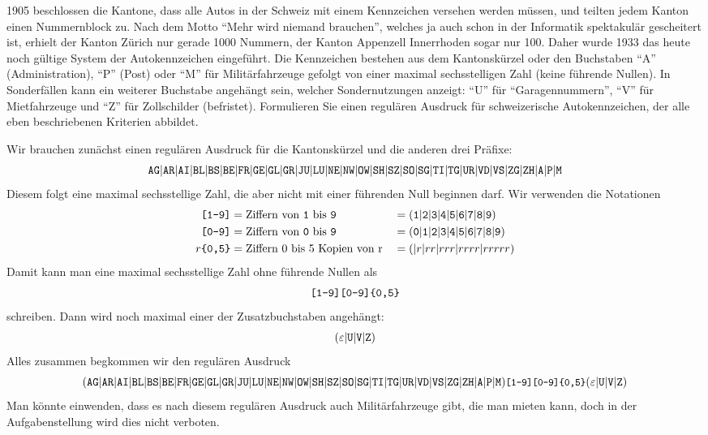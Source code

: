 1905 beschlossen die Kantone, dass alle Autos in der Schweiz mit einem
Kennzeichen versehen werden müssen, und teilten jedem Kanton einen
Nummernblock zu. Nach dem Motto ``Mehr wird niemand brauchen'', welches
ja auch schon in der Informatik spektakulär gescheitert ist, erhielt
der Kanton Zürich nur gerade 1000 Nummern, der
Kanton Appenzell Innerrhoden sogar nur 100.
Daher wurde 1933 das heute noch gültige System der Autokennzeichen
eingeführt. Die Kennzeichen bestehen aus dem Kantonskürzel
oder den Buchstaben ``A'' (Administration), ``P'' (Post) oder
``M'' für Militärfahrzeuge gefolgt von einer maximal sechsstelligen Zahl
(keine führende Nullen).
In Sonderfällen kann ein weiterer Buchstabe angehängt sein, welcher
Sondernutzungen anzeigt: ``U'' für ``Garagennummern'',
``V'' für Mietfahrzeuge und ``Z'' für Zollschilder (befristet).
Formulieren Sie einen regulären Ausdruck für schweizerische Autokennzeichen,
der alle eben beschriebenen Kriterien abbildet.


\begin{loesung}
Wir brauchen zunächst einen regulären Ausdruck für die Kantonskürzel
und die anderen drei Präfixe:
\[
{\tt AG}|
{\tt AR}|
{\tt AI}|
{\tt BL}|
{\tt BS}|
{\tt BE}|
{\tt FR}|
{\tt GE}|
{\tt GL}|
{\tt GR}|
{\tt JU}|
{\tt LU}|
{\tt NE}|
{\tt NW}|
{\tt OW}|
{\tt SH}|
{\tt SZ}|
{\tt SO}|
{\tt SG}|
{\tt TI}|
{\tt TG}|
{\tt UR}|
{\tt VD}|
{\tt VS}|
{\tt ZG}|
{\tt ZH}|
{\tt A}|
{\tt P}|
{\tt M}
\]
Diesem folgt eine maximal sechsstellige Zahl, die aber nicht mit einer
führenden Null beginnen darf. Wir verwenden die Notationen
\begin{align*}
\text{\tt [1-9]}&=\text{Ziffern von {\tt 1} bis {\tt 9}}
&&=
({\tt 1}|
{\tt 2}|
{\tt 3}|
{\tt 4}|
{\tt 5}|
{\tt 6}|
{\tt 7}|
{\tt 8}|
{\tt 9})
\\
\text{\tt [0-9]}&=\text{Ziffern von {\tt 0} bis {\tt 9}}
&&=
({\tt 0}|
{\tt 1}|
{\tt 2}|
{\tt 3}|
{\tt 4}|
{\tt 5}|
{\tt 6}|
{\tt 7}|
{\tt 8}|
{\tt 9})
\\
r{\text{\tt \{0,5\}}}&=\text{Ziffern 0 bis 5 Kopien von r}
&&=(|r|rr|rrr|rrrr|rrrrr)
\end{align*}
Damit kann man eine maximal sechsstellige Zahl ohne führende Nullen als
\[
\text{\tt [1-9][0-9]\{0,5\}}
\]
schreiben.
Dann wird noch maximal einer der Zusatzbuchstaben angehängt:
\[
(\varepsilon|{\tt U}|{\tt V}|{\tt Z})
\]
Alles zusammen begkommen wir den regulären Ausdruck
\[
\small
(
{\tt AG}|
{\tt AR}|
{\tt AI}|
{\tt BL}|
{\tt BS}|
{\tt BE}|
{\tt FR}|
{\tt GE}|
{\tt GL}|
{\tt GR}|
{\tt JU}|
{\tt LU}|
{\tt NE}|
{\tt NW}|
{\tt OW}|
{\tt SH}|
{\tt SZ}|
{\tt SO}|
{\tt SG}|
{\tt TI}|
{\tt TG}|
{\tt UR}|
{\tt VD}|
{\tt VS}|
{\tt ZG}|
{\tt ZH}|
{\tt A}|
{\tt P}|
{\tt M})
\text{\tt [1-9][0-9]\{0,5\}}
(\varepsilon|{\tt U}|{\tt V}|{\tt Z})
\]
Man könnte einwenden, dass es nach diesem regulären Ausdruck auch
Militärfahrzeuge gibt, die man mieten kann, doch in der Aufgabenstellung
wird dies nicht verboten.
\end{loesung}

